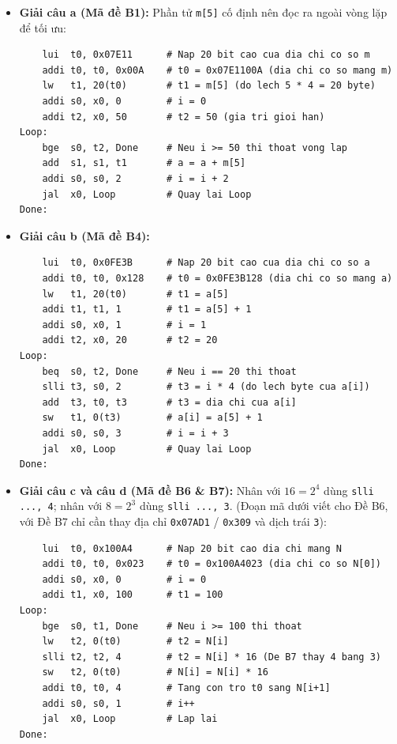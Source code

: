 \begin{itemize}
    \item \textbf{Giải câu a (Mã đề B1):} Phần tử \texttt{m[5]} cố định nên đọc ra ngoài vòng lặp để tối ưu:

\noindent\begin{minipage}{\linewidth}
\begin{lstlisting}
    lui  t0, 0x07E11      # Nap 20 bit cao cua dia chi co so m
    addi t0, t0, 0x00A    # t0 = 0x07E1100A (dia chi co so mang m)
    lw   t1, 20(t0)       # t1 = m[5] (do lech 5 * 4 = 20 byte)
    addi s0, x0, 0        # i = 0
    addi t2, x0, 50       # t2 = 50 (gia tri gioi han)
Loop:
    bge  s0, t2, Done     # Neu i >= 50 thi thoat vong lap
    add  s1, s1, t1       # a = a + m[5]
    addi s0, s0, 2        # i = i + 2
    jal  x0, Loop         # Quay lai Loop
Done:
\end{lstlisting}
\end{minipage}

    \item \textbf{Giải câu b (Mã đề B4):}

\noindent\begin{minipage}{\linewidth}
\begin{lstlisting}
    lui  t0, 0x0FE3B      # Nap 20 bit cao cua dia chi co so a
    addi t0, t0, 0x128    # t0 = 0x0FE3B128 (dia chi co so mang a)
    lw   t1, 20(t0)       # t1 = a[5]
    addi t1, t1, 1        # t1 = a[5] + 1
    addi s0, x0, 1        # i = 1
    addi t2, x0, 20       # t2 = 20
Loop:
    beq  s0, t2, Done     # Neu i == 20 thi thoat
    slli t3, s0, 2        # t3 = i * 4 (do lech byte cua a[i])
    add  t3, t0, t3       # t3 = dia chi cua a[i]
    sw   t1, 0(t3)        # a[i] = a[5] + 1
    addi s0, s0, 3        # i = i + 3
    jal  x0, Loop         # Quay lai Loop
Done:
\end{lstlisting}
\end{minipage}

    \item \textbf{Giải câu c và câu d (Mã đề B6 \& B7):} Nhân với $16 = 2^4$ dùng \texttt{slli ..., 4}; nhân với $8 = 2^3$ dùng \texttt{slli ..., 3}. (Đoạn mã dưới viết cho Đề B6, với Đề B7 chỉ cần thay địa chỉ \texttt{0x07AD1} / \texttt{0x309} và dịch trái \texttt{3}):

\noindent\begin{minipage}{\linewidth}
\begin{lstlisting}
    lui  t0, 0x100A4      # Nap 20 bit cao dia chi mang N
    addi t0, t0, 0x023    # t0 = 0x100A4023 (dia chi co so N[0])
    addi s0, x0, 0        # i = 0
    addi t1, x0, 100      # t1 = 100
Loop:
    bge  s0, t1, Done     # Neu i >= 100 thi thoat
    lw   t2, 0(t0)        # t2 = N[i]
    slli t2, t2, 4        # t2 = N[i] * 16 (De B7 thay 4 bang 3)
    sw   t2, 0(t0)        # N[i] = N[i] * 16
    addi t0, t0, 4        # Tang con tro t0 sang N[i+1]
    addi s0, s0, 1        # i++
    jal  x0, Loop         # Lap lai
Done:
\end{lstlisting}
\end{minipage}
\end{itemize}

